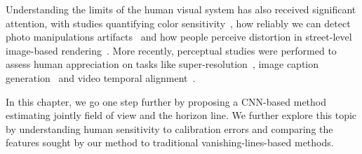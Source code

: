 Understanding the limits of the human visual system has also received significant attention, with studies quantifying color sensitivity~\cite{fairchild2013color}, how reliably we can detect photo manipulations artifacts~\cite{Farid2010} and how people perceive distortion in street-level image-based rendering~\cite{Vangorp2013}. More recently, perceptual studies were performed to assess human appreciation on tasks like super-resolution~\cite{ledig-cvpr-17}, image caption generation~\cite{vinyals-cvpr-15} and video temporal alignment~\cite{papazoglou-accv-16}.

In this chapter, we go one step further by proposing a CNN-based method estimating jointly field of view and the horizon line. We further explore this topic by understanding human sensitivity to calibration errors and comparing the features sought by our method to traditional vanishing-lines-based methods.
